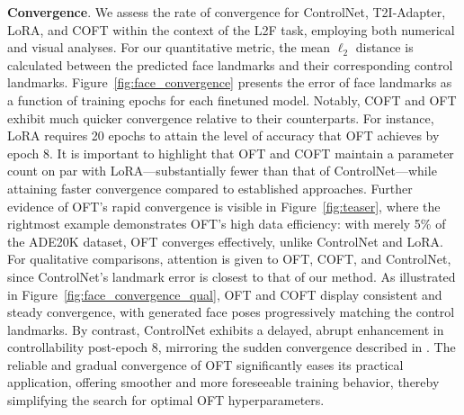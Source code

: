 \textbf{Convergence}. We assess the rate of convergence for ControlNet, T2I-Adapter, LoRA, and COFT within the context of the L2F task, employing both numerical and visual analyses. For our quantitative metric, the mean $\ell_2$ distance is calculated between the predicted face landmarks and their corresponding control landmarks. Figure~\ref{fig:face_convergence} presents the error of face landmarks as a function of training epochs for each finetuned model. Notably, COFT and OFT exhibit much quicker convergence relative to their counterparts. For instance, LoRA requires 20 epochs to attain the level of accuracy that OFT achieves by epoch 8. It is important to highlight that OFT and COFT maintain a parameter count on par with LoRA—substantially fewer than that of ControlNet—while attaining faster convergence compared to established approaches. Further evidence of OFT's rapid convergence is visible in Figure~\ref{fig:teaser}, where the rightmost example demonstrates OFT's high data efficiency: with merely 5\% of the ADE20K dataset, OFT converges effectively, unlike ControlNet and LoRA. For qualitative comparisons, attention is given to OFT, COFT, and ControlNet, since ControlNet’s landmark error is closest to that of our method. As illustrated in Figure~\ref{fig:face_convergence_qual}, OFT and COFT display consistent and steady convergence, with generated face poses progressively matching the control landmarks. By contrast, ControlNet exhibits a delayed, abrupt enhancement in controllability post-epoch 8, mirroring the sudden convergence described in \cite{zhang2023adding}. The reliable and gradual convergence of OFT significantly eases its practical application, offering smoother and more foreseeable training behavior, thereby simplifying the search for optimal OFT hyperparameters.

